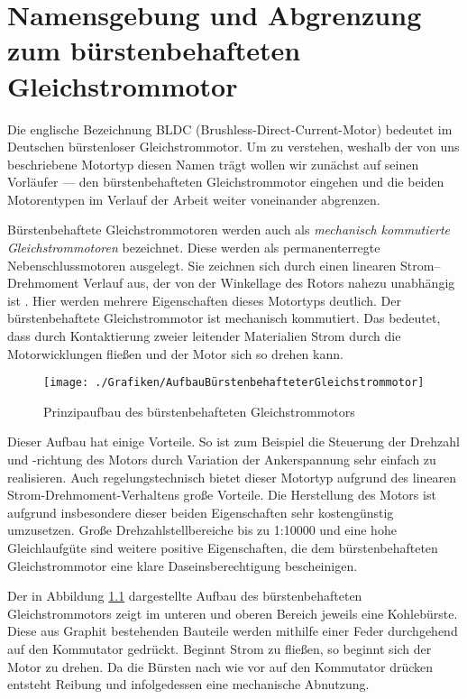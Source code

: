 \chapter{Namensgebung und Abgrenzung zum bürstenbehafteten Gleichstrommotor}

Die englische Bezeichnung \glqq{}BLDC\grqq{} (Brushless-Direct-Current-Motor) bedeutet im Deutschen \glqq{}bürstenloser Gleichstrommotor\grqq{}. Um zu verstehen, weshalb der von uns beschriebene Motortyp diesen Namen trägt wollen wir zunächst auf seinen Vorläufer --- den bürstenbehafteten Gleichstrommotor eingehen und die beiden Motorentypen im Verlauf der Arbeit weiter voneinander abgrenzen.

Bürstenbehaftete Gleichstrommotoren werden auch als \emph{mechanisch kommutierte Gleichstrommotoren} bezeichnet. Diese \glqq{}werden als permanenterregte Nebenschlussmotoren ausgelegt. Sie zeichnen sich durch einen linearen Strom–Drehmoment Verlauf aus, der von der Winkellage des Rotors nahezu unabhängig ist\grqq{} \parencite[S.51]{Probst2011}. Hier werden mehrere Eigenschaften dieses Motortyps deutlich. Der bürstenbehaftete Gleichstrommotor ist mechanisch kommutiert. Das bedeutet, dass durch Kontaktierung zweier leitender Materialien Strom durch die Motorwicklungen fließen und der Motor sich so drehen kann.

\begin{figure}[H]
  \centering
  \texttt{[image: ./Grafiken/AufbauBürstenbehafteterGleichstrommotor]}
  \caption[Aufbau bürstenbehafteter Gleichstrommotor]{Prinzipaufbau des bürstenbehafteten Gleichstrommotors \parencite[S.51]{Probst2011}}
  \label{fig:AufbauBürstenbehaftet}
\end{figure}

Dieser Aufbau hat einige Vorteile. So ist zum Beispiel die Steuerung der Drehzahl und -richtung des Motors durch Variation der Ankerspannung sehr einfach zu realisieren. Auch regelungstechnisch bietet dieser Motortyp aufgrund des linearen Strom-Drehmoment-Verhaltens große Vorteile. Die Herstellung des Motors ist aufgrund insbesondere dieser beiden Eigenschaften sehr kostengünstig umzusetzen. \glqq{}Große Drehzahlstellbereiche bis zu 1:10000 und eine hohe Gleichlaufgüte\grqq{} \parencite[S.51]{Probst2011} sind weitere positive Eigenschaften, die dem bürstenbehafteten Gleichstrommotor eine klare Daseinsberechtigung bescheinigen.

Der in Abbildung \ref{fig:AufbauBürstenbehaftet} dargestellte Aufbau des bürstenbehafteten Gleichstrommotors zeigt im unteren und oberen Bereich jeweils eine Kohlebürste. Diese aus Graphit bestehenden Bauteile werden mithilfe einer Feder durchgehend auf den Kommutator gedrückt. Beginnt Strom zu fließen, so beginnt sich der Motor zu drehen. Da die Bürsten nach wie vor auf den Kommutator drücken entsteht Reibung und infolgedessen eine mechanische Abnutzung.

